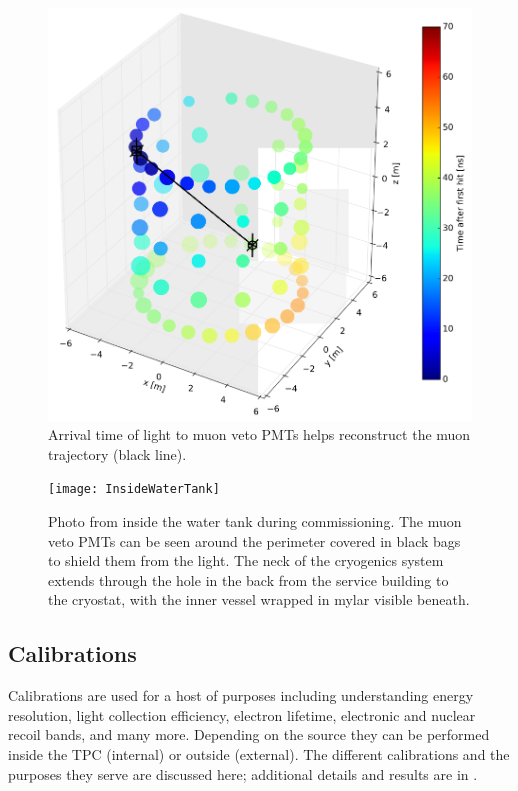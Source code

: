 \begin{figure}
\centering
\includegraphics[width=\textwidth]{MuonVetoEvent}
\caption{Arrival time of light to muon veto PMTs helps reconstruct the muon trajectory (black line).}
\label{fig:xenon1t_water_shield_photo}
\end{figure}

\begin{figure}
\centering
\texttt{[image: InsideWaterTank]}
\caption{Photo from inside the water tank during commissioning.  The muon veto PMTs can be seen around the perimeter covered in black bags
to shield them from the
light.  The neck of the cryogenics system extends through the hole in the back from the service building to the cryostat, with the
inner vessel wrapped in mylar visible beneath.}
\label{fig:xenon1t_water_shield_interior}
\end{figure}



\subsection{Calibrations}
\label{subsec:xenon1t_calibrations}
Calibrations are used for a host of purposes including understanding energy resolution, light collection efficiency, electron lifetime,
electronic and nuclear recoil bands, and many more.  Depending on the source they can be performed inside the TPC (internal)
or outside (external).  The different calibrations and the purposes they serve are discussed here; additional details and results are in
.

